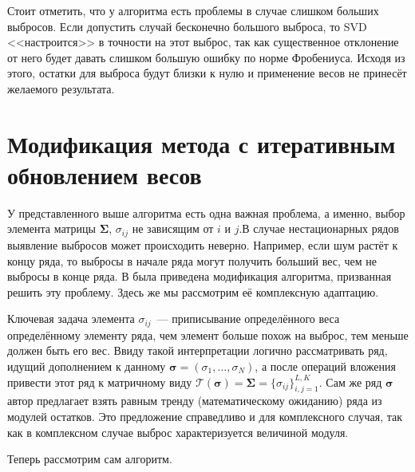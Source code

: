 \documentclass[specialist,
               substylefile = spbu.rtx,
               subf,href,colorlinks=true, 12pt]{disser}
\begin{document}
Стоит отметить, что у алгоритма есть проблемы в случае слишком больших выбросов. Если допустить случай бесконечно большого выброса, то SVD <<настроится>> в точности на этот выброс, так как существенное отклонение от него будет давать слишком большую ошибку по норме Фробениуса. Исходя из этого, остатки для выброса будут близки к нулю и применение весов не принесёт желаемого результата.

\section{Модификация метода с итеративным обновлением весов}

У представленного выше алгоритма есть одна важная проблема, а именно, выбор элемента матрицы $\mathbf{\Sigma}$, $\sigma_{ij}$ не зависящим от $i$ и $j$.В случае нестационарных рядов выявление выбросов может происходить неверно. Например, если шум растёт к концу ряда, то выбросы в начале ряда могут получить больший вес, чем не выбросы в конце ряда. В \cite{Tretyakova20} была приведена модификация алгоритма, призванная решить эту проблему. Здесь же мы рассмотрим её комплексную адаптацию.

Ключевая задача элемента $\sigma_{ij}$~--- приписывание определённого веса определённому элементу ряда, чем элемент больше похож на выброс, тем меньше должен быть его вес. Ввиду такой интерпретации логично рассматривать ряд, идущий дополнением к данному $\bm{\sigma} = (\sigma_1,\ldots,\sigma_N)$, а после операций вложения привести этот ряд к матричному виду $\mathcal{T} (\bm{\sigma}) = \mathbf{\Sigma}=\{\sigma_{ij}\}_{i,j=1}^{L,K}$. Сам же ряд $\bm{\sigma}$ автор \cite{Tretyakova20} предлагает взять равным тренду (математическому ожиданию) ряда из модулей остатков. Это предложение справедливо и для комплексного случая, так как в комплексном случае выброс характеризуется величиной модуля.

Теперь рассмотрим сам алгоритм.
\end{document}
